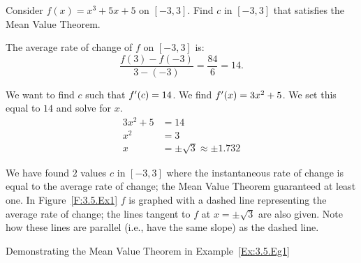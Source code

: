 

\begin{example} \label{Ex:3.5.Eg1}
Consider $f(x) = x^3+5x+5$ on $[-3,3]$. Find $c$ in $[-3,3]$ that satisfies the Mean Value Theorem.

\solution
The average rate of change of $f$ on $[-3,3]$ is:
		$$\frac{f(3)-f(-3)}{3-(-3)} = \frac{84}{6} = 14.$$
		
We want to find $c$ such that $f'(c) = 14$. We find $f'(x) = 3x^2+5$. We set this equal to $14$ and solve for $x$. 
		\begin{align*}
		3x^2 +5 &= 14\\
		x^2  &= 3\\
		x &= \pm \sqrt{3} \approx \pm 1.732
		\end{align*}
		
We have found $2$ values $c$ in $[-3,3]$ where the instantaneous rate of change is equal to the average rate of change; the Mean Value Theorem guaranteed at least one. In Figure~\ref{F:3.5.Ex1} $f$ is graphed with a dashed line representing the average rate of change; the lines tangent to $f$ at $x=\pm \sqrt{3}$ are also given. Note how these lines are parallel (i.e., have the same slope) as the dashed line.

\end{example}

\begin{marginfigure}[-8cm]
\caption{Demonstrating the Mean Value Theorem in Example~\ref{Ex:3.5.Eg1}}\label{F:3.5.Ex1}
\end{marginfigure}